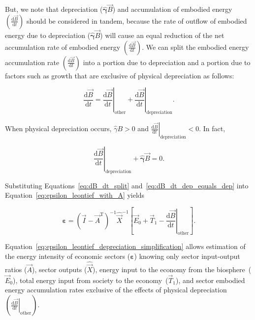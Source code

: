 But, we note that depreciation ($\hat{\bm{\gamma}}\vec{B}$) 
and accumulation of embodied energy 
$\left( \frac{\mathrm{d}\vec{B}}{\mathrm{d}t} \right)$
should be considered in tandem,
because the rate of outflow of embodied energy due to depreciation
($\hat{\bm{\gamma}}\vec{B}$)
will cause an equal reduction of the net accumulation rate of embodied energy
$\left( \frac{\mathrm{d}\vec{B}}{\mathrm{d}t} \right)$.
We can split the embodied energy accumulation rate 
$\left( \frac{\mathrm{d}\vec{B}}{\mathrm{d}t} \right)$
into a portion due to depreciation and a portion due to 
factors such as growth that are exclusive of physical depreciation as follows:

\begin{equation} \label{eq:dB_dt_split}
	\frac{\mathrm{d}\vec{B}}{\mathrm{d}t} 
	= \left. \frac{\mathrm{d}\vec{B}}{\mathrm{d}t} \right|_{\mathrm{other}} 
	+ \left. \frac{\mathrm{d}\vec{B}}{\mathrm{d}t} \right|_{\mathrm{depreciation}}.
\end{equation}

\noindent{}When physical depreciation occurs,
$\hat{\gamma}B > 0$ and 
$\left. \frac{\mathrm{d}\vec{B}}{\mathrm{d}t} \right|_{\mathrm{depreciation}} < 0$.
In fact,

\begin{equation} \label{eq:dB_dt_dep_equals_dep}
	\left. \frac{\mathrm{d}\vec{B}}{\mathrm{d}t} \right|_{\mathrm{depreciation}} 
	+ \hat{\bm{\gamma}}\vec{B}
	= 0.
\end{equation}

\noindent{}Substituting Equations~\ref{eq:dB_dt_split} and~\ref{eq:dB_dt_dep_equals_dep}
into Equation~\ref{eq:epsilon_leontief_with_A} yields

\begin{equation} \label{eq:epsilon_leontief_depreciation_simplification}
	\bm{\varepsilon} 
	= {(\vec{I} - \vec{A}^{\mathrm{T}})}^{-1}\hat{\vec{X}}^{-1}
		\left[\vec{E}_{0} 
				+ \vec{T}_{1} 
				- \left. \frac{\mathrm{d}\vec{B}}{\mathrm{d}t} \right|_{\mathrm{other}}
		\right].
\end{equation}

\noindent{}Equation~\ref{eq:epsilon_leontief_depreciation_simplification} 
allows estimation of the energy intensity 
of economic sectors ($\bm{\varepsilon}$) 
knowing only 
sector input-output ratios ($\vec{A}$), 
sector outputs ($\hat{\vec{X}}$), 
energy input to the economy from the biosphere~($\vec{E}_{0}$), 
total energy input from society to the economy~($\vec{T}_{1}$), and
sector embodied energy accumulation rates
exclusive of the effects of physical
depreciation~$\left( \left. \frac{\mathrm{d}\vec{B}}{\mathrm{d}t} \right|_{\mathrm{other}} \right)$.


